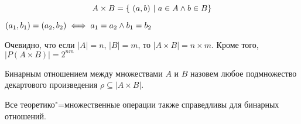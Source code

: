 \begin{equation*}
    A \times B = \{ ~(a, b) ~|~ a \in A \wedge b \in B\}
\end{equation*}

$(a_1, b_1) = (a_2, b_2) \iff a_1 = a_2 \wedge b_1 = b_2$

Очевидно, что если $|A| = n$, $|B| = m$, то $|A\times B| = n \times m$. Кроме того, $|P(A\times B)| = 2^{nm}$

Бинарным отношением между множествами $A$ и $B$ назовем любое подмножество
декартового произведения $\rho \subseteq |A \times B|$.

Все теоретико"=множественные операции также справедливы для бинарных отношений.










    
